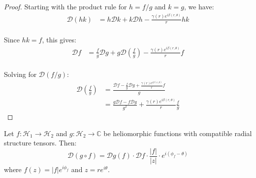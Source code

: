\begin{proof}
Starting with the product rule for $h = f/g$ and $k = g$, we have:
\begin{align}
\mathcal{D}(hk) &= h\mathcal{D}k + k\mathcal{D}h - \frac{\gamma(r)e^{i\beta(r,\theta)}}{r}hk\\
\end{align}

Since $hk = f$, this gives:
\begin{align}
\mathcal{D}f &= \frac{f}{g}\mathcal{D}g + g\mathcal{D}\left(\frac{f}{g}\right) - \frac{\gamma(r)e^{i\beta(r,\theta)}}{r}f\\
\end{align}

Solving for $\mathcal{D}(f/g)$:
\begin{align}
\mathcal{D}\left(\frac{f}{g}\right) &= \frac{\mathcal{D}f - \frac{f}{g}\mathcal{D}g + \frac{\gamma(r)e^{i\beta(r,\theta)}}{r}f}{g}\\
&= \frac{g\mathcal{D}f - f\mathcal{D}g}{g^2} + \frac{\gamma(r)e^{i\beta(r,\theta)}}{r}\frac{f}{g}
\end{align}
\end{proof}

\begin{theorem}
Let $f: \mathcal{H}_1 \rightarrow \mathcal{H}_2$ and $g: \mathcal{H}_2 \rightarrow \mathbb{C}$ be heliomorphic functions with compatible radial structure tensors. Then:
\begin{equation}
\mathcal{D}(g \circ f) = \mathcal{D}g(f) \cdot \mathcal{D}f \cdot \frac{|f|}{|z|} \cdot e^{i(\phi_f - \theta)}
\end{equation}
where $f(z) = |f|e^{i\phi_f}$ and $z = re^{i\theta}$.
\end{theorem}

